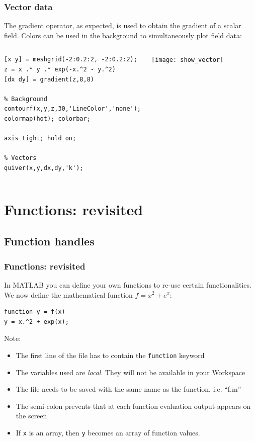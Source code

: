 \begin{frame}[fragile]
  \frametitle{Vector data}
  The gradient operator, as expected, is used to obtain the gradient of a scalar field. Colors can be used in the background to simultaneously plot field data:
  \begin{columns}[T]
    \begin{lstlisting}
[x y] = meshgrid(-2:0.2:2, -2:0.2:2);
z = x .* y .* exp(-x.^2 - y.^2)
[dx dy] = gradient(z,8,8)

% Background
contourf(x,y,z,30,'LineColor','none');
colormap(hot); colorbar;

axis tight; hold on;

% Vectors
quiver(x,y,dx,dy,'k');
    \end{lstlisting}
   \begin{center}
      \texttt{[image: show\_vector]}
    \end{center}
  \end{columns}
\end{frame}

\section{Functions: revisited}
\subsection*{Function handles}
\begin{frame}[fragile]
  \frametitle{Functions: revisited}
  In MATLAB you can define your own functions to re-use certain functionalities. We now define the mathematical function $f = x^2+e^x$:
  \begin{lstlisting}
function y = f(x)
y = x.^2 + exp(x);
  \end{lstlisting}
  \pause
  Note:
  \begin{itemize}
    \item The first line of the file has to contain the \lstinline$function$ keyword
    \item The variables used are \emph{local}. They will not be available in your Workspace
    \item The file needs to be saved with the same name as the function, i.e. ``f.m''
    \item The semi-colon prevents that at each function evaluation output appears on the screen
    \item If \lstinline$x$ is an array, then \lstinline$y$ becomes an array of function values.
  \end{itemize}
\end{frame}

